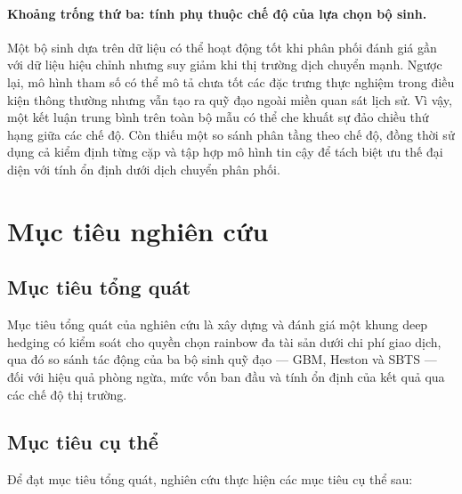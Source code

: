 \paragraph{Khoảng trống thứ ba: tính phụ thuộc chế độ của lựa chọn bộ sinh.}
Một bộ sinh dựa trên dữ liệu có thể hoạt động tốt khi phân phối đánh giá gần
với dữ liệu hiệu chỉnh nhưng suy giảm khi thị trường dịch chuyển mạnh. Ngược
lại, mô hình tham số có thể mô tả chưa tốt các đặc trưng thực nghiệm trong điều
kiện thông thường nhưng vẫn tạo ra quỹ đạo ngoài miền quan sát lịch sử. Vì
vậy, một kết luận trung bình trên toàn bộ mẫu có thể che khuất sự đảo chiều
thứ hạng giữa các chế độ. Còn thiếu một so sánh phân tầng theo chế độ, đồng
thời sử dụng cả kiểm định từng cặp và tập hợp mô hình tin cậy để tách biệt ưu
thế đại diện với tính ổn định dưới dịch chuyển phân phối.

\section{Mục tiêu nghiên cứu}
\label{sec:muc-tieu-nghien-cuu}

\subsection{Mục tiêu tổng quát}

Mục tiêu tổng quát của nghiên cứu là xây dựng và đánh giá một khung deep
hedging có kiểm soát cho quyền chọn rainbow đa tài sản dưới chi phí giao dịch,
qua đó so sánh tác động của ba bộ sinh quỹ đạo --- \textsc{GBM}, Heston và
\textsc{SBTS} --- đối với hiệu quả phòng ngừa, mức vốn ban đầu và tính ổn định
của kết quả qua các chế độ thị trường.

\subsection{Mục tiêu cụ thể}

Để đạt mục tiêu tổng quát, nghiên cứu thực hiện các mục tiêu cụ thể sau:

